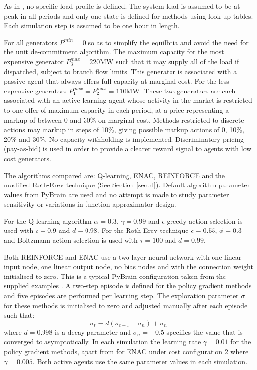 As in , no specific load profile is defined. The
system load is assumed to be at peak in all periods and only one state is
defined for methods using look-up tables.  Each simulation step is assumed to be one
hour in length.

For all generators $P^{min}=0$ so as to simplify the equilbria and avoid the
need for the unit de-commitment algorithm.  The maximum capacity for the most
expensive generator $P^{max}_3=220$MW such that it may supply all of the
load if dispatched, subject to branch flow limits.  This generator is
associated with a passive agent that always offers full capacity at marginal cost.  For the less expensive generators
$P^{max}_1=P^{max}_2=110$MW.  These two generators are each associated with an
active learning agent whose activity in the market is restricted to one offer of
maximum capacity in each period, at a price representing a markup of between 0
and 30\% on marginal cost.  Methods restricted to discrete actions may markup in
steps of 10\%, giving possible markup actions of 0, 10\%, 20\% and 30\%.  No
capacity withholding is implemented.
Discriminatory pricing (pay-as-bid) is used in order to provide a clearer reward
signal to agents with low cost generators.

The algorithms compared are: Q-learning, ENAC, REINFORCE and the modified
Roth-Erev technique (See Section \ref{sec:rl}). Default algorithm parameter
values from PyBrain are used and no attempt is made to study parameter
sensitivity or variations in function approximator design.

For the Q-learning algorithm $\alpha=0.3$, $\gamma=0.99$ and $\epsilon$-greedy
action selection is used with $\epsilon=0.9$ and $d=0.98$.  For the Roth-Erev
technique $\epsilon=0.55$, $\phi=0.3$ and Boltzmann action selection is used
with $\tau=100$ and $d=0.99$.

Both REINFORCE and ENAC use a two-layer neural network with one linear input
node, one linear output node, no bias nodes and with the connection weight
initialised to zero.  This is a typical PyBrain configuration taken from the
supplied examples \cite{schaul:2010}. A two-step episode is defined for the
policy gradient methods and five episodes are performed per learning step.  The
exploration parameter $\sigma$ for these methods is initialised to zero and
adjusted manually after each episode such that:
\begin{equation}
\label{eq:sigmadecay}
\sigma_{t} = d(\sigma_{t-1}-\sigma_{n})+\sigma_{n}
\end{equation}
where $d=0.998$ is a decay parameter and $\sigma_{n}=-0.5$ specifies the
value that is converged to asymptotically.  In each simulation the learning rate
$\gamma=0.01$ for the policy gradient methods, apart from for ENAC under cost
configuration 2 where $\gamma=0.005$.  Both active agents use the same
parameter values in each simulation.

